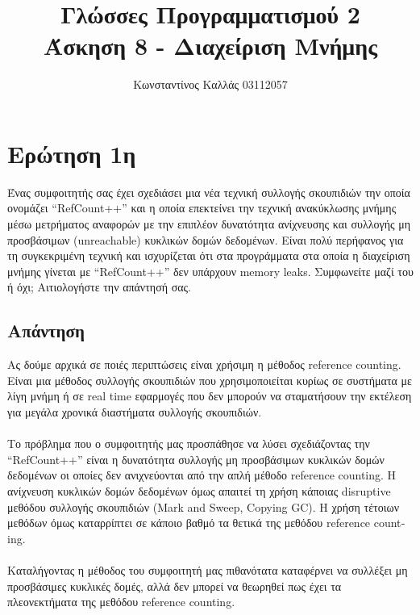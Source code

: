 \documentclass[a4paper]{article}
\title{ \textbf{Γλώσσες Προγραμματισμού 2} \\ Άσκηση 8 - Διαχείριση Μνήμης}
\author{Κωνσταντίνος Καλλάς 03112057}
\begin{document}
\maketitle
\lstset{language=C}

\section*{Ερώτηση 1η}
Ένας συμφοιτητής σας έχει σχεδιάσει μια νέα τεχνική συλλογής σκουπιδιών την οποία ονομάζει
\foreignlanguage{english}{“RefCount++”} και η οποία επεκτείνει την τεχνική ανακύκλωσης μνήμης μέσω μετρήματος αναφορών με την επιπλέον δυνατότητα ανίχνευσης και συλλογής μη προσβάσιμων (\foreignlanguage{english}{unreachable}) κυκλικών δομών δεδομένων. Είναι πολύ περήφανος για τη συγκεκριμένη τεχνική και ισχυρίζεται ότι
στα προγράμματα στα οποία η διαχείριση μνήμης γίνεται με \foreignlanguage{english}{“RefCount++”} δεν υπάρχουν \foreignlanguage{english}{memory leaks}. Συμφωνείτε μαζί του ή όχι; Αιτιολογήστε την απάντησή σας.
\subsection*{Απάντηση}
Ας δούμε αρχικά σε ποιές περιπτώσεις είναι χρήσιμη η μέθοδος \foreignlanguage{english}{reference counting}. Είναι μια μέθοδος συλλογής σκουπιδιών που χρησιμοποιείται κυρίως σε συστήματα με λίγη μνήμη ή σε \foreignlanguage{english}{real time} εφαρμογές που δεν μπορούν να σταματήσουν την εκτέλεση για μεγάλα χρονικά διαστήματα συλλογής σκουπιδιών. \\\\
Το πρόβλημα που ο συμφοιτητής μας προσπάθησε να λύσει σχεδιάζοντας την \foreignlanguage{english}{“RefCount++”} είναι η δυνατότητα συλλογής μη προσβάσιμων κυκλικών δομών δεδομένων οι οποίες δεν ανιχνεύονται από την απλή μέθοδο \foreignlanguage{english}{reference counting}. Η ανίχνευση κυκλικών δομών δεδομένων όμως απαιτεί τη χρήση κάποιας \foreignlanguage{english}{disruptive} μεθόδου συλλογής σκουπιδιών (\foreignlanguage{english}{Mark and Sweep, Copying GC}). Η χρήση τέτοιων μεθόδων όμως καταρρίπτει σε κάποιο βαθμό τα θετικά της μεθόδου \foreignlanguage{english}{reference counting}. \\\\
Καταλήγοντας η μέθοδος του συμφοιτητή μας πιθανότατα καταφέρνει να συλλέξει μη προσβάσιμες κυκλικές δομές, αλλά δεν μπορεί να θεωρηθεί πως έχει τα πλεονεκτήματα της μεθόδου \foreignlanguage{english}{reference counting}.
\end{document}
